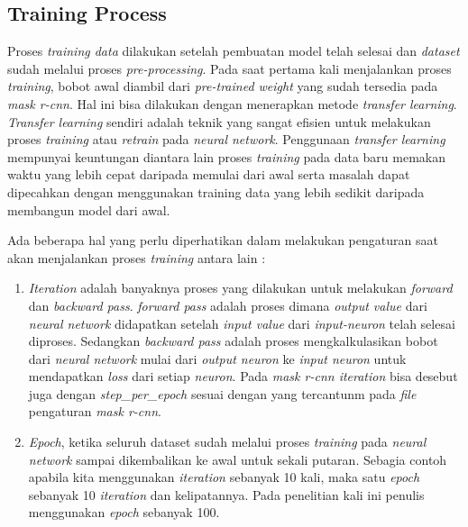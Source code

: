 \documentclass[conference]{IEEEtran}
\begin{document}
	\subsection{Training Process}
	\vspace{1ex}
	Proses \textit{training data} dilakukan setelah pembuatan model telah selesai dan \textit{dataset} sudah melalui proses \textit{pre-processing}. Pada saat pertama kali menjalankan proses \textit{training}, bobot awal diambil dari \textit{pre-trained weight} yang sudah tersedia pada \textit{mask r-cnn}. Hal ini bisa dilakukan dengan menerapkan metode \textit{transfer learning}. \textit{Transfer learning} sendiri adalah teknik yang
	sangat efisien untuk melakukan proses \textit{training} atau \textit{retrain} pada \textit{neural network}. Penggunaan \textit{transfer learning} mempunyai keuntungan diantara lain proses \textit{training} pada data baru memakan waktu yang lebih cepat daripada memulai dari awal serta masalah dapat dipecahkan dengan menggunakan training data
	yang lebih sedikit daripada membangun model dari awal.
	
	Ada beberapa hal yang perlu diperhatikan dalam melakukan pengaturan saat akan menjalankan proses \textit{training} antara lain :
	\begin{enumerate}
		\item \textit{Iteration} adalah banyaknya proses yang dilakukan untuk melakukan \textit{forward} dan \textit{backward pass}. \textit{forward pass} adalah proses dimana \textit{output value} dari \textit{neural network} didapatkan setelah \textit{input value} dari \textit{input-neuron} telah selesai diproses. Sedangkan \textit{backward pass} adalah proses mengkalkulasikan bobot dari \textit{neural network} mulai dari \textit{output neuron} ke \textit{input neuron} untuk mendapatkan \textit{loss} dari setiap \textit{neuron}. Pada \textit{mask r-cnn iteration} bisa desebut juga dengan \textit{step\_per\_epoch} sesuai dengan yang tercantunm pada \textit{file} pengaturan \textit{mask r-cnn}. 
		
		\item \textit{Epoch}, ketika seluruh dataset sudah melalui proses \textit{training} pada \textit{neural network} sampai dikembalikan ke awal untuk sekali putaran. Sebagia contoh apabila kita menggunakan \textit{iteration} sebanyak 10 kali, maka satu \textit{epoch} sebanyak 10 \textit{iteration} dan kelipatannya. Pada penelitian kali ini penulis menggunakan \textit{epoch} sebanyak 100.
	\end{enumerate}
\end{document}
